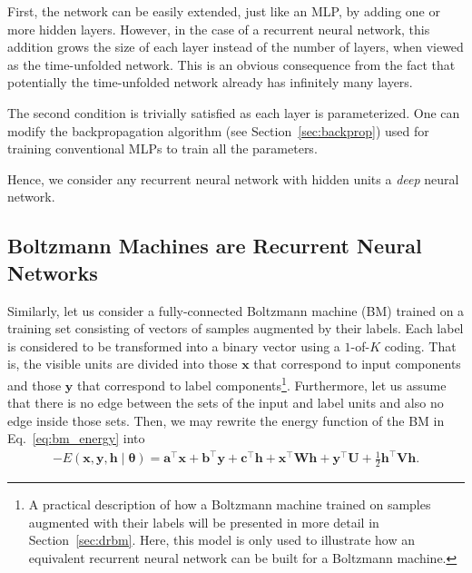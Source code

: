 \documentclass[dissertation,nocontribution,draft*]{aaltoseries}
\newcommand{\vect}[1]{\mathbf{#1}}
\newcommand{\vects}[1]{\boldsymbol{#1}}
\newcommand{\matr}[1]{\mathbf{#1}}
\newcommand{\va}[0]{\vect{a}}
\newcommand{\vb}[0]{\vect{b}}
\newcommand{\vc}[0]{\vect{c}}
\newcommand{\vh}[0]{\vect{h}}
\newcommand{\vx}[0]{\vect{x}}
\newcommand{\vy}[0]{\vect{y}}
\newcommand{\mW}[0]{\matr{W}}
\newcommand{\mU}[0]{\matr{U}}
\newcommand{\mV}[0]{\matr{V}}
\newcommand{\TT}[0]{{\vects{\theta}}}
\begin{document}
First, the network can be easily extended, just like an MLP,
by adding one or more hidden layers. However, in the case of
a recurrent neural network, this addition grows the size of
each layer instead of the number of layers, when viewed as
the time-unfolded network. This is an obvious consequence
from the fact that potentially the time-unfolded network
already has infinitely many layers.


The second condition is trivially satisfied as each layer is
parameterized. One can modify the backpropagation algorithm
(see Section~\ref{sec:backprop}) used for training
conventional MLPs to train all the parameters.

Hence, we consider any recurrent neural network with hidden
units a \textit{deep} neural network. 

\subsection{Boltzmann Machines are Recurrent Neural Networks}

Similarly, let us consider a fully-connected Boltzmann
machine (BM) trained on a training set consisting of vectors
of samples augmented by their labels. Each label is
considered to be transformed into a binary vector using a
$1$-of-$K$ coding.  That is, the visible units are divided
into those $\vx$ that correspond to input components and
those $\vy$ that correspond to label components\footnote{ 
A practical description of how a
Boltzmann machine trained on samples augmented with their
labels will be presented in more detail in Section~\ref{sec:drbm}.
Here, this model is only used to illustrate how
an equivalent recurrent neural network can be built for a Boltzmann
machine.
}.
Furthermore, let us assume that there is no edge between the
sets of the input and label units and also no edge inside
those sets. Then, we may rewrite the energy function of the
BM in Eq.~\eqref{eq:bm_energy} into
\begin{align}
    \label{eq:disbm_energy}
    -E(\vx, \vy, \vh \mid \TT) = \va^\top \vx + \vb^\top \vy
    + \vc^\top \vh + \vx^\top \mW \vh + \vy^\top \mU +
    \frac{1}{2} \vh^\top \mV \vh.
\end{align}
\end{document}
